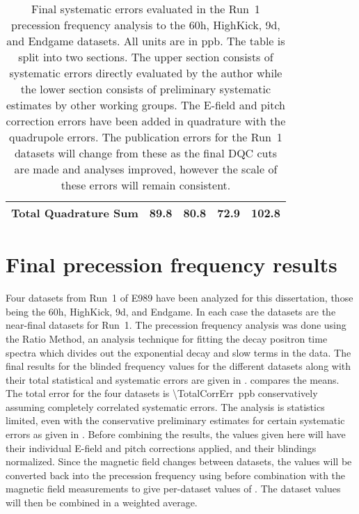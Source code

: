 \begin{table}
\begin{tabular*}{\linewidth}{@{\extracolsep{\fill}}lGGGG}
  \hline\hline
    Total Quadrature Sum & 89.8 & 80.8 & 72.9 & 102.8 \\
  \hline
\end{tabular*}
\caption[Systematic errors evaluated in the Run~1 precession frequency datasets]{Final systematic errors evaluated in the Run~1 precession frequency analysis to the 60h, HighKick, 9d, and Endgame datasets. All units are in ppb. The table is split into two sections. The upper section consists of systematic errors directly evaluated by the author while the lower section consists of preliminary systematic estimates by other working groups. The E-field and pitch correction errors have been added in quadrature with the quadrupole errors. The publication errors for the Run~1 datasets will change from these as the final DQC cuts are made and analyses improved, however the scale of these errors will remain consistent.}
\label{tab:FinalSystematicErrors}
\end{table}



\section{Final precession frequency results}


Four datasets from Run~1 of E989 have been analyzed for this dissertation, those being the 60h, HighKick, 9d, and Endgame. In each case the datasets are the near-final datasets for Run~1. The precession frequency analysis was done using the Ratio Method, an analysis technique for fitting the decay positron time spectra which divides out the exponential decay and slow terms in the data. The final results for the blinded frequency \R values for the different datasets along with their total statistical and systematic errors are given in .  compares the means. The total error for the four datasets is \SI{\TotalCorrErr}{ppb} conservatively assuming completely correlated systematic errors. The analysis is statistics limited, even with the conservative preliminary estimates for certain systematic errors as given in . Before combining the results, the \R values given here will have their individual E-field and pitch corrections applied, and their blindings normalized. Since the magnetic field changes between datasets, the \R values will be converted back into the precession frequency \wa using  before combination with the magnetic field measurements to give per-dataset values of \amu. The dataset \amu values will then be combined in a weighted average.



